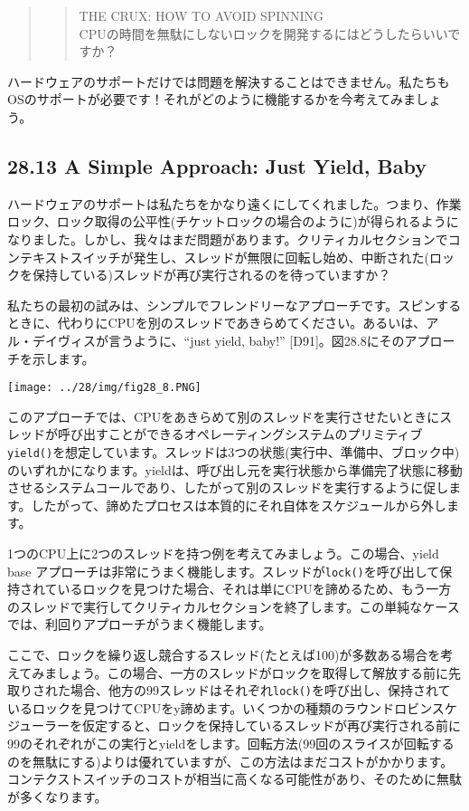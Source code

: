 \begin{quote}
\begin{quote}
THE CRUX: HOW TO AVOID SPINNING\\
CPUの時間を無駄にしないロックを開発するにはどうしたらいいですか？
\end{quote}
\end{quote}

ハードウェアのサポートだけでは問題を解決することはできません。私たちもOSのサポートが必要です！それがどのように機能するかを今考えてみましょう。

\hypertarget{a-simple-approach-just-yield-baby}{%
\subsection*{28.13 A Simple Approach: Just Yield,
Baby}\label{a-simple-approach-just-yield-baby}}

ハードウェアのサポートは私たちをかなり遠くにしてくれました。つまり、作業ロック、ロック取得の公平性(チケットロックの場合のように)が得られるようになりました。しかし、我々はまだ問題があります。クリティカルセクションでコンテキストスイッチが発生し、スレッドが無限に回転し始め、中断された(ロックを保持している)スレッドが再び実行されるのを待っていますか？

私たちの最初の試みは、シンプルでフレンドリーなアプローチです。スピンするときに、代わりにCPUを別のスレッドであきらめてください。あるいは、アル・デイヴィスが言うように、``just
yield, baby!'' {[}D91{]}。図28.8にそのアプローチを示します。

\texttt{[image: ../28/img/fig28\_8.PNG]}

このアプローチでは、CPUをあきらめて別のスレッドを実行させたいときにスレッドが呼び出すことができるオペレーティングシステムのプリミティブ\texttt{yield()}を想定しています。スレッドは3つの状態(実行中、準備中、ブロック中)のいずれかになります。yieldは、呼び出し元を実行状態から準備完了状態に移動させるシステムコールであり、したがって別のスレッドを実行するように促します。したがって、諦めたプロセスは本質的にそれ自体をスケジュールから外します。

1つのCPU上に2つのスレッドを持つ例を考えてみましょう。この場合、yield
base
アプローチは非常にうまく機能します。スレッドが\texttt{lock()}を呼び出して保持されているロックを見つけた場合、それは単にCPUを諦めるため、もう一方のスレッドで実行してクリティカルセクションを終了します。この単純なケースでは、利回りアプローチがうまく機能します。

ここで、ロックを繰り返し競合するスレッド(たとえば100)が多数ある場合を考えてみましょう。この場合、一方のスレッドがロックを取得して解放する前に先取りされた場合、他方の99スレッドはそれぞれ\texttt{lock()}を呼び出し、保持されているロックを見つけてCPUをy諦めます。いくつかの種類のラウンドロビンスケジューラーを仮定すると、ロックを保持しているスレッドが再び実行される前に99のそれぞれがこの実行とyieldをします。回転方法(99回のスライスが回転するのを無駄にする)よりは優れていますが、この方法はまだコストがかかります。コンテクストスイッチのコストが相当に高くなる可能性があり、そのために無駄が多くなります。

